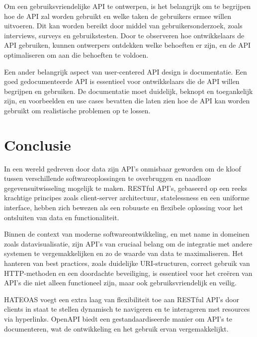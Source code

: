 \bigskip

Om een gebruiksvriendelijke API te ontwerpen, is het belangrijk om te begrijpen hoe de API zal worden gebruikt en welke taken de gebruikers ermee willen uitvoeren. Dit kan worden bereikt door middel van gebruikersonderzoek, zoals interviews, surveys en gebruikstesten. Door te observeren hoe ontwikkelaars de API gebruiken, kunnen ontwerpers ontdekken welke behoeften er zijn, en de API optimaliseren om aan die behoeften te voldoen.

\bigskip

Een ander belangrijk aspect van user-centered API design is documentatie. Een goed gedocumenteerde API is essentieel voor ontwikkelaars die de API willen begrijpen en gebruiken. De documentatie moet duidelijk, beknopt en toegankelijk zijn, en voorbeelden en use cases bevatten die laten zien hoe de API kan worden gebruikt om realistische problemen op te lossen.

\section{Conclusie}

In een wereld gedreven door data zijn API's onmisbaar geworden om de kloof tussen verschillende softwareoplossingen te overbruggen en naadloze gegevensuitwisseling mogelijk te maken. RESTful API's, gebaseerd op een reeks krachtige principes zoals client-server architectuur, statelessness en een uniforme interface, hebben zich bewezen als een robuuste en flexibele oplossing voor het ontsluiten van data en functionaliteit. 

\bigskip

Binnen de context van moderne softwareontwikkeling, en met name in domeinen zoals datavisualisatie, zijn API's van cruciaal belang om de integratie met andere systemen te vergemakkelijken en zo de waarde van data te maximaliseren. Het hanteren van best practices, zoals duidelijke URI-structuren, correct gebruik van HTTP-methoden en een doordachte beveiliging, is essentieel voor het creëren van API's die niet alleen functioneel zijn, maar ook gebruiksvriendelijk en veilig.

\bigskip

HATEOAS voegt een extra laag van flexibiliteit toe aan RESTful API's door clients in staat te stellen dynamisch te navigeren en te interageren met resources via hyperlinks. OpenAPI biedt een gestandaardiseerde manier om API's te documenteren, wat de ontwikkeling en het gebruik ervan vergemakkelijkt.

